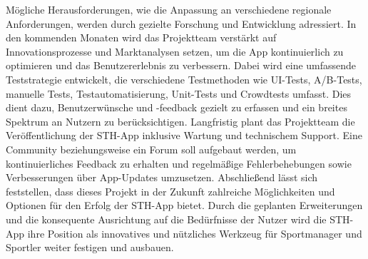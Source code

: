 Mögliche Herausforderungen, wie die Anpassung an verschiedene regionale Anforderungen, werden durch gezielte Forschung und Entwicklung adressiert.
In den kommenden Monaten wird das Projektteam verstärkt auf Innovationsprozesse und Marktanalysen setzen, um die App kontinuierlich zu optimieren und das Benutzererlebnis zu verbessern. Dabei wird eine umfassende Teststrategie entwickelt, die verschiedene Testmethoden wie UI-Tests, A/B-Tests, manuelle Tests, Testautomatisierung, Unit-Tests und Crowdtests umfasst. Dies dient dazu, Benutzerwünsche und -feedback gezielt zu erfassen und ein breites Spektrum an Nutzern zu berücksichtigen.
Langfristig plant das Projektteam die Veröffentlichung der STH-App inklusive Wartung und technischem Support. Eine Community beziehungsweise ein Forum soll aufgebaut werden, um kontinuierliches Feedback zu erhalten und regelmäßige Fehlerbehebungen sowie Verbesserungen über App-Updates umzusetzen.\newline
Abschließend lässt sich feststellen, dass dieses Projekt in der Zukunft zahlreiche Möglichkeiten und Optionen für den Erfolg der STH-App bietet. Durch die geplanten Erweiterungen und die konsequente Ausrichtung auf die Bedürfnisse der Nutzer wird die STH-App ihre Position als innovatives und nützliches Werkzeug für Sportmanager und Sportler weiter festigen und ausbauen.